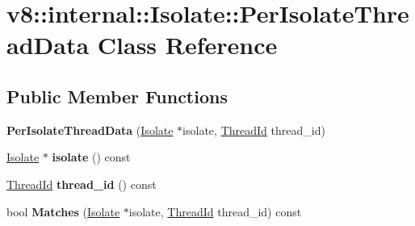 \hypertarget{classv8_1_1internal_1_1_isolate_1_1_per_isolate_thread_data}{}\section{v8\+:\+:internal\+:\+:Isolate\+:\+:Per\+Isolate\+Thread\+Data Class Reference}
\label{classv8_1_1internal_1_1_isolate_1_1_per_isolate_thread_data}
\subsection*{Public Member Functions}
\begin{DoxyCompactItemize}
\item 
{\bfseries Per\+Isolate\+Thread\+Data} (\hyperlink{classv8_1_1internal_1_1_isolate}{Isolate} $\ast$isolate, \hyperlink{classv8_1_1internal_1_1_thread_id}{Thread\+Id} thread\+\_\+id)\hypertarget{classv8_1_1internal_1_1_isolate_1_1_per_isolate_thread_data_ac7375d147bcf918363e02932ab036b98}{}\label{classv8_1_1internal_1_1_isolate_1_1_per_isolate_thread_data_ac7375d147bcf918363e02932ab036b98}

\item 
\hyperlink{classv8_1_1internal_1_1_isolate}{Isolate} $\ast$ {\bfseries isolate} () const \hypertarget{classv8_1_1internal_1_1_isolate_1_1_per_isolate_thread_data_aa6864a4f2821eefca8e3aad845d2beb2}{}\label{classv8_1_1internal_1_1_isolate_1_1_per_isolate_thread_data_aa6864a4f2821eefca8e3aad845d2beb2}

\item 
\hyperlink{classv8_1_1internal_1_1_thread_id}{Thread\+Id} {\bfseries thread\+\_\+id} () const \hypertarget{classv8_1_1internal_1_1_isolate_1_1_per_isolate_thread_data_a0a6a459da5f4810865cfa71d85ee18ef}{}\label{classv8_1_1internal_1_1_isolate_1_1_per_isolate_thread_data_a0a6a459da5f4810865cfa71d85ee18ef}

\item 
bool {\bfseries Matches} (\hyperlink{classv8_1_1internal_1_1_isolate}{Isolate} $\ast$isolate, \hyperlink{classv8_1_1internal_1_1_thread_id}{Thread\+Id} thread\+\_\+id) const \hypertarget{classv8_1_1internal_1_1_isolate_1_1_per_isolate_thread_data_aa6d416451308983f1955bb40eed14867}{}\label{classv8_1_1internal_1_1_isolate_1_1_per_isolate_thread_data_aa6d416451308983f1955bb40eed14867}

\end{DoxyCompactItemize}
